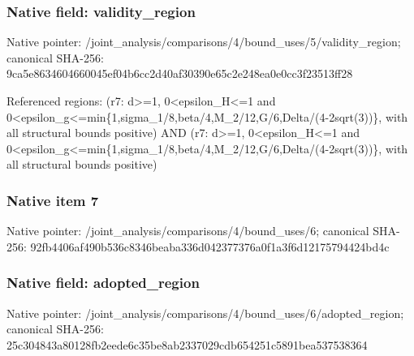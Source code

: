 \documentclass[10pt,a4paper]{article}
\begin{document}
\subsubsection{Native field: validity\_\allowbreak{}region}
Native pointer: /joint\_\allowbreak{}analysis/comparisons/4/bound\_\allowbreak{}uses/5/validity\_\allowbreak{}region; canonical SHA-256: 9ca5e8634604660045ef04b6cc2d40af30390e65c2e248ea0e0cc3f23513ff28

\begingroup\raggedright\sloppy Referenced regions:\allowbreak{} (r7:\allowbreak{} d>=\allowbreak{}1,\allowbreak{} 0<epsilon\_\allowbreak{}H<=\allowbreak{}1 and 0<epsilon\_\allowbreak{}g<=\allowbreak{}min\{1,\allowbreak{}sigma\_\allowbreak{}1/\allowbreak{}8,\allowbreak{}beta/\allowbreak{}4,\allowbreak{}M\_\allowbreak{}2/\allowbreak{}12,\allowbreak{}G/\allowbreak{}6,\allowbreak{}Delta/\allowbreak{}(4-2sqrt(3))\},\allowbreak{} with all structural bounds positive) AND (r7:\allowbreak{} d>=\allowbreak{}1,\allowbreak{} 0<epsilon\_\allowbreak{}H<=\allowbreak{}1 and 0<epsilon\_\allowbreak{}g<=\allowbreak{}min\{1,\allowbreak{}sigma\_\allowbreak{}1/\allowbreak{}8,\allowbreak{}beta/\allowbreak{}4,\allowbreak{}M\_\allowbreak{}2/\allowbreak{}12,\allowbreak{}G/\allowbreak{}6,\allowbreak{}Delta/\allowbreak{}(4-2sqrt(3))\},\allowbreak{} with all structural bounds positive)\par\endgroup

\subsubsection{Native item 7}
Native pointer: /joint\_\allowbreak{}analysis/comparisons/4/bound\_\allowbreak{}uses/6; canonical SHA-256: 92fb4406af490b536c8346beaba336d042377376a0f1a3f6d12175794424bd4c

\subsubsection{Native field: adopted\_\allowbreak{}region}
Native pointer: /joint\_\allowbreak{}analysis/comparisons/4/bound\_\allowbreak{}uses/6/adopted\_\allowbreak{}region; canonical SHA-256: 25c304843a80128fb2eede6c35be8ab2337029cdb654251c5891bea537538364
\end{document}
